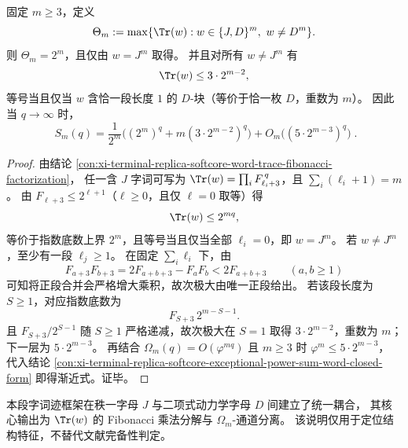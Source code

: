 \begin{conclusion}\label{con:xi-terminal-replica-softcore-tunneling-channel-dominance}
固定 \(m\ge 3\)，定义
\[
\Theta_m:=\max\{\Tr(w):w\in\{J,D\}^m,\ w\neq D^m\}.
\]
则 \(\Theta_m=2^m\)，且仅由 \(w=J^m\) 取得。
并且对所有 \(w\neq J^m\) 有
\[
\Tr(w)\le 3\cdot2^{m-2},
\]
等号当且仅当 \(w\) 含恰一段长度 \(1\) 的 \(D\)-块（等价于恰一枚 \(D\)，重数为 \(m\)）。
因此当 \(q\to\infty\) 时，
\[
\boxed{\;
S_m(q)=\frac1{2^m}\Big((2^m)^q+m(3\cdot2^{m-2})^q\Big)
+O_m\!\big((5\cdot2^{m-3})^q\big)\; }.
\]
\end{conclusion}
\begin{proof}
由结论 \ref{con:xi-terminal-replica-softcore-word-trace-fibonacci-factorization}，
任一含 \(J\) 字词可写为
\(
\Tr(w)=\prod_i F_{\ell_i+3}^{\,q}
\)，且 \(\sum_i(\ell_i+1)=m\)。
由 \(F_{\ell+3}\le 2^{\ell+1}\)（\(\ell\ge0\)，且仅 \(\ell=0\) 取等）得
\[
\Tr(w)\le 2^{mq},
\]
等价于指数底数上界 \(2^m\)，且等号当且仅当全部 \(\ell_i=0\)，即 \(w=J^m\)。
若 \(w\neq J^m\)，至少有一段 \(\ell_j\ge1\)。
在固定 \(\sum_i\ell_i\) 下，由
\[
F_{a+3}F_{b+3}=2F_{a+b+3}-F_aF_b<2F_{a+b+3}\qquad(a,b\ge1)
\]
可知将正段合并会严格增大乘积，故次极大由唯一正段给出。
若该段长度为 \(S\ge1\)，对应指数底数为
\[
F_{S+3}\,2^{m-S-1}.
\]
且 \(F_{S+3}/2^{S-1}\) 随 \(S\ge1\) 严格递减，故次极大在 \(S=1\) 取得
\(3\cdot2^{m-2}\)，重数为 \(m\)；下一层为 \(5\cdot2^{m-3}\)。
再结合 \(\Omega_m(q)=O(\varphi^{mq})\) 且 \(m\ge3\) 时 \(\varphi^m\le 5\cdot2^{m-3}\)，
代入结论 \ref{con:xi-terminal-replica-softcore-exceptional-power-sum-word-closed-form}
即得渐近式。证毕。
\end{proof}

\begin{remark}[结构可检索性说明]\label{rem:xi-terminal-replica-softcore-word-trace-public-search-note}
本段字词迹框架在秩一字母 \(J\) 与二项式动力学字母 \(D\) 间建立了统一耦合，
其核心输出为 \(\Tr(w)\) 的 Fibonacci 乘法分解与 \(\Omega_m\)-通道分离。
该说明仅用于定位结构特征，不替代文献完备性判定。
\end{remark}


